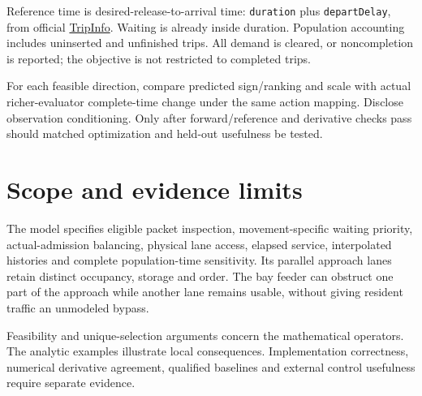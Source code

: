 \documentclass[10pt,a4paper]{article}
\begin{document}
Reference time is desired-release-to-arrival time:
\texttt{duration} plus \texttt{departDelay}, from official
\href{https://sumo.dlr.de/docs/Simulation/Output/TripInfo.html}{TripInfo}.
Waiting is already inside duration. Population accounting includes
uninserted and unfinished trips. All demand is cleared, or noncompletion
is reported; the objective is not restricted to completed trips.

For each feasible direction, compare predicted sign/ranking and scale
with actual richer-evaluator complete-time change under the same action
mapping. Disclose observation conditioning. Only after forward/reference
and derivative checks pass should matched optimization and held-out
usefulness be tested.

\section{Scope and evidence limits}

The model specifies eligible packet inspection, movement-specific waiting
priority, actual-admission balancing, physical lane access, elapsed
service, interpolated histories and complete population-time sensitivity.
Its parallel approach lanes retain distinct occupancy, storage and order.
The bay feeder can obstruct one part of the approach while another lane
remains usable, without giving resident traffic an unmodeled bypass.

Feasibility and unique-selection arguments concern the mathematical
operators. The analytic examples illustrate local consequences.
Implementation correctness, numerical derivative agreement, qualified
baselines and external control usefulness require separate evidence.
\end{document}
